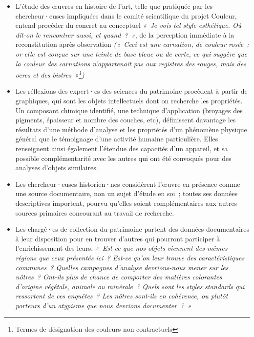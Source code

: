 \documentclass[a4paper,12pt, twoside]{book}
\begin{document}
\begin{itemize}
    \item L’étude des œuvres en histoire de l’art, telle que pratiquée par les chercheur·euses impliquées dans le comité scientifique du projet Couleur, entend procéder du concret au conceptuel \textit{«~Je vois tel style esthétique. Où dit-on le rencontrer aussi, et quand~?~»}, de la perception immédiate à la reconstitution après observation \textit{(«~Ceci est une carnation, de couleur rosée~; or elle est conçue sur une teinte de base bleue ou de verte, ce qui suggère que la couleur des carnations n’appartenait pas aux registres des rouges, mais des ocres et des bistres~»\footnote{Termes de désignation des couleurs non contractuels})}\\

    \item Les réflexions des expert·es des sciences du patrimoine procèdent à partir de graphiques, qui sont les objets intellectuels dont on recherche les propriétés. Un composant chimique identifié, une technique d’application (broyages des pigments, épaisseur et nombre des couches, etc), définissent davantage les résultats d’une méthode d’analyse et les propriétés d’un phénomène physique général que le témoignage d’une activité humaine particulière. Elles renseignent ainsi également l’étendue des capacités d’un appareil, et sa possible complémentarité avec les autres qui ont été convoqués pour des analyses d’objets similaires.\\

    \item Les chercheur·euses historien·nes considèrent l’œuvre en présence comme une source documentaire, non un sujet d’étude en soi~; toutes ses données descriptives importent, pourvu qu’elles soient complémentaires aux autres sources primaires concourant au travail de recherche.\\

    \item Les chargé·es de collection du patrimoine partent des données documentaires à leur disposition pour en trouver d’autres qui pourront participer à l’enrichissement des leurs. \textit{«~Est-ce que nos objets viennent des mêmes régions que ceux présentés ici~? Est-ce qu’on leur trouve des caractéristiques communes~? Quelles campagnes d’analyse devrions-nous mener sur les nôtres~? Ont-ils plus de chance de comporter des matières colorantes d’origine végétale, animale ou minérale~? Quels sont les styles standards qui ressortent de ces enquêtes~? Les nôtres sont-ils en cohérence, ou plutôt porteurs d’un atypisme que nous devrions documenter~?~»}\\


\end{itemize}
\end{document}
